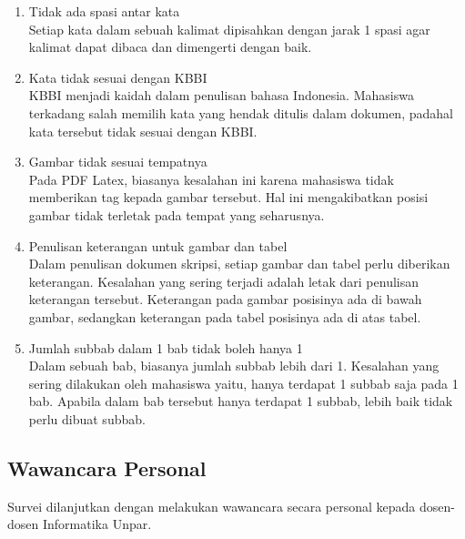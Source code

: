 \begin{enumerate}
	\item Tidak ada spasi antar kata \\
	Setiap kata dalam sebuah kalimat dipisahkan dengan jarak 1 spasi agar kalimat dapat dibaca dan dimengerti dengan baik.
	
	\item Kata tidak sesuai dengan KBBI \\
	KBBI menjadi kaidah dalam penulisan bahasa Indonesia. Mahasiswa terkadang salah memilih kata yang hendak ditulis dalam dokumen, padahal kata tersebut tidak sesuai dengan KBBI.

	\item Gambar tidak sesuai tempatnya \\
	Pada PDF Latex, biasanya kesalahan ini karena mahasiswa tidak memberikan tag kepada gambar tersebut. Hal ini mengakibatkan posisi gambar tidak terletak pada tempat yang seharusnya.

	\item Penulisan keterangan untuk gambar dan tabel \\
	Dalam penulisan dokumen skripsi, setiap gambar dan tabel perlu diberikan keterangan. Kesalahan yang sering terjadi adalah letak dari penulisan keterangan tersebut. Keterangan pada gambar posisinya ada di bawah gambar, sedangkan keterangan pada tabel posisinya ada di atas tabel.

	\item Jumlah subbab dalam 1 bab tidak boleh hanya 1 \\
	Dalam sebuah bab, biasanya jumlah subbab lebih dari 1. Kesalahan yang sering dilakukan oleh mahasiswa yaitu, hanya terdapat 1 subbab saja pada 1 bab. Apabila dalam bab tersebut hanya terdapat 1 subbab, lebih baik tidak perlu dibuat subbab.
	
\end{enumerate}

\subsection{Wawancara Personal}
Survei dilanjutkan dengan melakukan wawancara secara personal kepada dosen-dosen Informatika Unpar.

